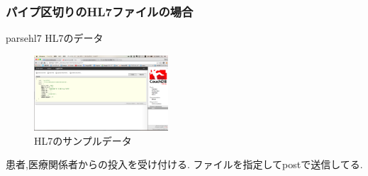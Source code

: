 		\subsubsection{パイプ区切りのHL7ファイルの場合}
			parsehl7
			HL7のデータ
			\\
			\begin{figure}[htbp]
					\includegraphics[width=5cm, bb=0 0 437 688]{./gazou/hl7.png}
				\caption{HL7のサンプルデータ}
				\label{ss-mix_sampledata}
			\end{figure}

	患者,医療関係者からの投入を受け付ける.
	ファイルを指定してpostで送信してる.
